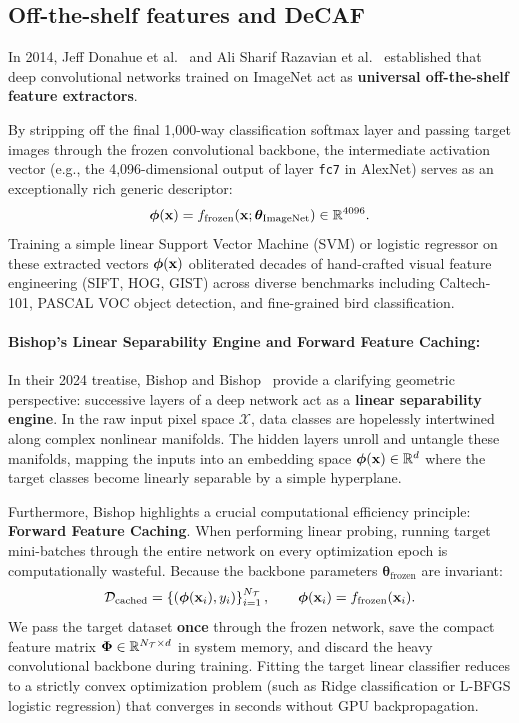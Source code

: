\subsection{Off-the-shelf features and DeCAF}
\label{sec:decaf_features}

In 2014, Jeff Donahue et al.~\cite{donahue2014decaf} and Ali Sharif Razavian et al.~\cite{razavian2014cnn} established that deep convolutional networks trained on ImageNet act as \textbf{universal off-the-shelf feature extractors}. 

By stripping off the final 1,000-way classification softmax layer and passing target images through the frozen convolutional backbone, the intermediate activation vector (e.g., the 4,096-dimensional output of layer \texttt{fc7} in AlexNet) serves as an exceptionally rich generic descriptor:
\begin{equation}
\boldsymbol{\phi}(\mathbf{x}) = f_{\text{frozen}}(\mathbf{x}; \boldsymbol{\theta}_{\text{ImageNet}}) \in \mathbb{R}^{4096}.
\label{eq:feature_extractor_phi}
\end{equation}
Training a simple linear Support Vector Machine (SVM) or logistic regressor on these extracted vectors $\boldsymbol{\phi}(\mathbf{x})$ obliterated decades of hand-crafted visual feature engineering (SIFT, HOG, GIST) across diverse benchmarks including Caltech-101, PASCAL VOC object detection, and fine-grained bird classification.

\paragraph{Bishop's Linear Separability Engine and Forward Feature Caching:}
In their 2024 treatise, Bishop and Bishop~\cite{bishop2024deep} provide a clarifying geometric perspective: successive layers of a deep network act as a \textbf{linear separability engine}. In the raw input pixel space $\mathcal{X}$, data classes are hopelessly intertwined along complex nonlinear manifolds. The hidden layers unroll and untangle these manifolds, mapping the inputs into an embedding space $\boldsymbol{\phi}(\mathbf{x}) \in \mathbb{R}^d$ where the target classes become linearly separable by a simple hyperplane.

Furthermore, Bishop highlights a crucial computational efficiency principle: \textbf{Forward Feature Caching}. When performing linear probing, running target mini-batches through the entire network on every optimization epoch is computationally wasteful. Because the backbone parameters $\boldsymbol{\theta}_{\text{frozen}}$ are invariant:
\begin{equation}
\mathcal{D}_{\text{cached}} = \left\{ \left(\boldsymbol{\phi}(\mathbf{x}_i), y_i\right) \right\}_{i=1}^{N_{\mathcal{T}}}, \qquad \boldsymbol{\phi}(\mathbf{x}_i) = f_{\text{frozen}}(\mathbf{x}_i).
\end{equation}
We pass the target dataset \textbf{once} through the frozen network, save the compact feature matrix $\mathbf{\Phi} \in \mathbb{R}^{N_{\mathcal{T}} \times d}$ in system memory, and discard the heavy convolutional backbone during training. Fitting the target linear classifier reduces to a strictly convex optimization problem (such as Ridge classification or L-BFGS logistic regression) that converges in seconds without GPU backpropagation.

